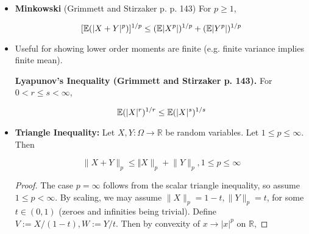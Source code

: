 \begin{itemize}
\begin{itemize}
\begin{proof}
\[
 \leq \log \bigg( \frac{1}{p} x^p + \frac{1}{q} y^q\bigg) 
 \]
 
 \[
 \implies (x^p)^{1/p}(y^q)^{1/q} \leq \frac{1}{p} x^p + \frac{1}{q} y^q
 \]
 
 Fixing an \(\omega \in \Omega\), we have
 
 \[
|X(\omega) Y(\omega)| =  (|X(\omega)|^p)^{1/p}(|Y(\omega)|^q)^{1/q} \leq \frac{1}{p}  |X(\omega)|^p + \frac{1}{q}  |Y(\omega)|^q
 \]
 
Integrating we have...
 
\end{proof}

\begin{theorem} For any \(u, v \in \mathbb{R}^n\),

\[
| u^T v | \leq \lVert u \rVert_p \lVert v \rVert_q
\]
for any \(p, q \in [0, \infty]\) satisfying \(1/p + 1/q = 1\).

\end{theorem}

\item \begin{theorem} \textbf{Minkowski} (Grimmett and Stirzaker p. p. 143) For \(p \geq 1\),

\[
[\mathbb{E}(|X + Y|^p)]^{1/p} \leq (\mathbb{E}|X^p|)^{1/p} + (\mathbb{E}|Y^p|)^{1/p}
\]
\end{theorem}

\item Useful for showing lower order moments are finite (e.g. finite variance implies finite mean). \begin{lemma}\textbf{Lyapunov's Inequality (Grimmett and Stirzaker p. 143).}\label{asym.lyapunov} For \(0 < r \leq s < \infty\),

\[
\mathbb{E}(|X|^r)^{1/r} \leq \mathbb{E}(|X|^s)^{1/s} 
\]
\end{lemma}

\item \begin{theorem}\label{asym.tri.ineq.norm} \textbf{Triangle Inequality:} Let \(X, Y: \Omega \to \mathbb{R}\) be random variables. Let \(1 \leq p \leq \infty\). Then

\[
\lVert X+Y\rVert_p \leq \Vert X\rVert_p + \lVert Y \rVert_p, 1 \leq p \leq \infty
\]

\begin{proof} The case \(p = \infty\) follows from the scalar triangle inequality, so assume \(1 \leq p < \infty\). By scaling, we may assume \(\lVert X \rVert_p = 1 - t, \lVert Y \rVert_p = t\), for some \(t \in (0,1)\) (zeroes and infinities being trivial). Define \(V:=X/(1-t), W:=Y/t\). Then by convexity of \(x \to |x|^p\) on \(\mathbb{R}\), 


\end{proof}
\end{theorem}
\end{itemize}
\end{itemize}
